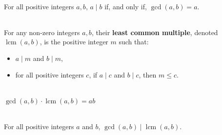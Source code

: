 \documentclass[12pt]{article}
\DeclareMathOperator{\lcm}{lcm}
\begin{document}
\begin{proposition}
\hfill\\ 
\normalfont For all positive integers $a, b$, $a \mid b$ if, and only if, $\gcd(a, b) = a$.
\end{proposition}
\begin{definition}[4.6.1]
\hfill\\
\normalfont For any non-zero integers $a, b$, their \textbf{least common multiple}, denoted
$\lcm(a, b)$, is the positive integer $m$ such that:
\begin{itemize}
\item $a \mid m$ and $b \mid m$,
\item for all positive integers $c$, if $a \mid c$ and $b \mid c$, then $m \leq c$.
\end{itemize}
\end{definition}
\begin{proposition}
\hfill\\
\normalfont $\gcd(a,b)\cdot\lcm(a,b)=ab$
\end{proposition}
\begin{proposition}
\hfill\\
\normalfont For all positive integers $a$ and $b$, $\gcd(a, b)\mid \lcm(a, b)$.
\end{proposition}
\end{document}
